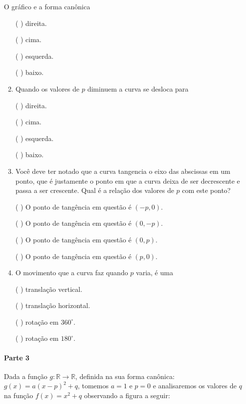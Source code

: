 \begin{task}{O gráfico e a forma canônica}
\begin{enumerate}
({ }{ }{ }) direita.

({ }{ }{ }) cima.

({ }{ }{ }) esquerda.

({ }{ }{ }) baixo.

\item {} 
Quando os valores de \(p\) diminuem a curva se desloca para

({ }{ }{ }) direita.

({ }{ }{ }) cima.

({ }{ }{ }) esquerda.

({ }{ }{ }) baixo.

\item {} 
Você deve ter notado que a curva tangencia o eixo das abscissas em um ponto, que é justamente o ponto em que a curva deixa de ser decrescente e passa a ser crescente. Qual é a relação dos valores de \(p\) com este ponto?

({ }{ }{ }) O ponto de tangência em questão é \((-p,0)\).

({ }{ }{ }) O ponto de tangência em questão é \((0,-p)\).

({ }{ }{ }) O ponto de tangência em questão é \((0,p)\).

({ }{ }{ }) O ponto de tangência em questão é \((p,0)\).

\item {} 
O movimento que a curva faz quando \(p\) varia, é uma

({ }{ }{ }) translação vertical.

({ }{ }{ }) translação horizontal.

({ }{ }{ }) rotação em \(360^{\circ}\).

({ }{ }{ }) rotação em \(180^{\circ}\).

\end{enumerate}

\paragraph{Parte 3}

Dada a função \(g:\mathbb{R}\to\mathbb{R}\), definida na sua forma canônica: \(g(x)=a(x-p)^2+q\), tomemos \(a=1\) e \(p=0\) e analisaremos os valores de \(q\) na função \(f(x)=x^2+q\) observando a figura a seguir:


\begin{figure}[H]
\centering


\end{figure}
\end{task}
